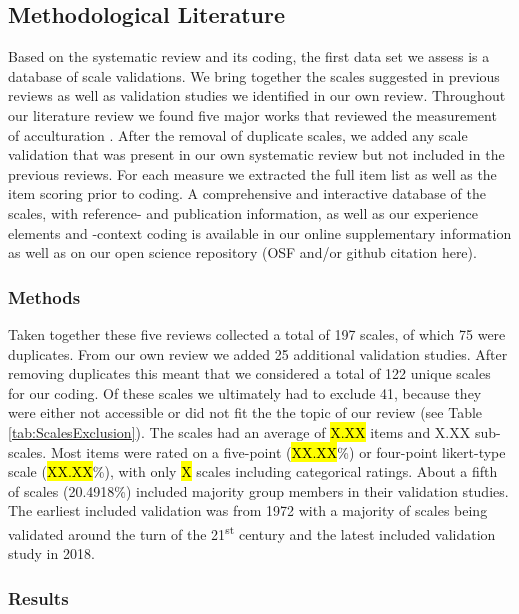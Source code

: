 \subsection{Methodological Literature}

Based on the systematic review and its coding, the first data set we
assess is a database of scale validations. We bring together the scales
suggested in previous reviews as well as validation studies we
identified in our own review. Throughout our literature review we found
five major works that reviewed the measurement of acculturation
\citep{Celenk2011, Maestas2000, Matsudaira2006, Wallace2010, Zane2004}.
After the removal of duplicate scales, we added any scale validation
that was present in our own systematic review but not included in the
previous reviews. For each measure we extracted the full item list as
well as the item scoring prior to coding. A comprehensive and
interactive database of the scales, with reference- and publication
information, as well as our experience elements and -context coding is
available in our online supplementary information as well as on our open
science repository (OSF and/or github citation here).

\subsubsection{Methods}

Taken together these five reviews collected a total of 197 scales, of
which 75 were duplicates. From our own review we added 25 additional
validation studies. After removing duplicates this meant that we
considered a total of 122 unique scales for our coding. Of these scales
we ultimately had to exclude 41, because they were either not accessible
or did not fit the the topic of our review (see Table 
\ref{tab:ScalesExclusion}). The scales had an average of \hl{X.XX} items
and X.XX sub-scales. Most items were rated on a five-point
(\hl{XX.XX}\%) or four-point likert-type scale (\hl{XX.XX}\%), with only
\hl{X} scales including categorical ratings. About a fifth of scales
(20.4918\%) included majority group members in their validation studies.
The earliest included validation was from 1972 with a majority of scales
being validated around the turn of the 21\textsuperscript{st} century
and the latest included validation study in 2018.



\subsubsection{Results}

